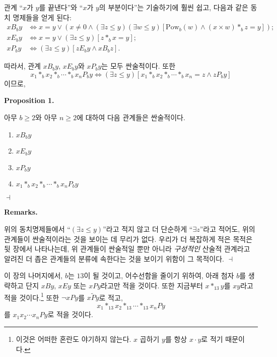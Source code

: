 \documentclass[12pt]{paper}
\newenvironment{context}[1][]
{ \noindent \textbf{{#1}.}
}
{ \hfill $ \dashv $ }
\begin{document}
관계 ``$x$가 $y$를 끝낸다''와 ``$x$가 $y$의 부분이다''는 기술하기에 훨씬 쉽고, 다음과 같은 동치 명제들을 얻게 된다:
\begin{align*}
x B_{b} y & \iff x = y \lor \left( x \ne 0 \land \left( \exists z \le y \right) \left( \exists w \le y \right) \left[ \mathrm{Pow}_{b} \left( w \right) \land \left( x \times w \right) *_{b} z = y \right] \right) ; \\
x E_{b} y & \iff x = y \lor \left( \exists z \le y \right) \left[ z *_{b} x = y \right] ; \\
x P_{b} y & \iff \left( \exists z \le y \right) \left[ z E_{b} y \land x B_{b} z \right] .
\end{align*}

따라서, 관계 $x B_{b} y$, $x E_{b} y$와 $x P_{b} y$는 모두 싼술적이다. 또한
$$ x_{1} *_{b} x_{2} *_{b} \cdots *_{b} x_{n} P_{b} y \iff \left( \exists z \le y \right) \left[ x_{1} *_{b} x_{2} *_{b} \cdots *_{b} x_{n} = z \land z P_{b} y \right] $$이므로,

\begin{context}[Proposition 1]
아무 $b \ge 2$와 아무 $n \ge 2$에 대하여 다음 관계들은 싼술적이다. 
\begin{enumerate}
\item $x B_{b} y$
\item $x E_{b} y$
\item $x P_{b} y$
\item $x_{1} *_{b} x_{2} *_{b} \cdots *_{b} x_{n} P_{b} y$
\end{enumerate} 
\end{context}

\begin{context}[Remarks]
위의 동치명제들에서 ``$\left( \exists z \le y \right)$''라고 적지 않고 더 단순하게 ``$\exists z$''라고 적어도,
위의 관계들이 싼술적이라는 것을 보이는 데 무리가 없다. 우리가 더 복잡하게 적은 목적은 뒷 장에서 나타나는데,
위 관계들이 싼술적일 뿐만 아니라 \textit{구성적인} 산술적 관계라고 알려진 더 좁은 관계들의 분류에 속한다는 것을 보이기 위함이 그 목적이다.
\end{context}

이 장의 나머지에서, $b$는 $13$이 될 것이고, 어수선함을 줄이기 위하여, 아래 첨자 $b$를 생략하고 단지 $x B y$, $x E y$ 또는 $x P y$라고만 적을 것이다.
또한 지금부터 $x *_{13} y$를 $x y$라고 적을 것이다.\footnote
{
이것은 어떠한 혼란도 야기하지 않는다. $x$ 곱하기 $y$를 항상 $x \cdot y$로 적기 때문이다.
}
또한 $\lnot x P y$를 $x \widetilde{P} y$로 적고, $$ x_1 *_{13} x_2 *_{13} \cdots *_{13} x_{n} P y $$를 $x_1 x_2 \cdots x_{n} P y$로 적을 것이다. 
\end{document}

